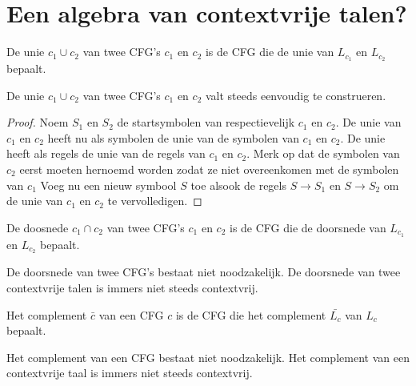 \documentclass[main.tex]{subfiles}
\begin{document}
\section{Een algebra van contextvrije talen?}

\begin{de}
  De unie $c_{1} \cup c_{2}$ van twee CFG's $c_{1}$ en $c_{2}$ is de CFG die de unie van $L_{c_{1}}$ en $L_{c_{2}}$ bepaalt.
\end{de}

\begin{st}
  De unie $c_{1} \cup c_{2}$ van twee CFG's $c_{1}$ en $c_{2}$ valt steeds eenvoudig te construeren.
  
  \begin{proof}
    Noem $S_{1}$ en $S_{2}$ de startsymbolen van respectievelijk $c_{1}$ en $c_{2}$.
    De unie van $c_{1}$ en $c_{2}$ heeft nu als symbolen de unie van de symbolen van $c_{1}$ en $c_{2}$.
    De unie heeft als regels de unie van de regels van $c_{1}$ en $c_{2}$.
    Merk op dat de symbolen van $c_{2}$ eerst moeten hernoemd worden zodat ze niet overeenkomen met de symbolen van $c_{1}$
    Voeg nu een nieuw symbool $S$ toe alsook de regels $S\rightarrow S_{1}$ en $S\rightarrow S_{2}$ om de unie van $c_{1}$ en $c_{2}$ te vervolledigen.
  \end{proof}
\end{st}

\begin{de}
  De doosnede $c_{1} \cap c_{2}$ van twee CFG's $c_{1}$ en $c_{2}$ is de CFG die de doorsnede van $L_{c_{1}}$ en $L_{c_{2}}$ bepaalt.
\end{de}

\begin{st}
  De doorsnede van twee CFG's bestaat niet noodzakelijk.
  De doorsnede van twee contextvrije talen is immers niet steeds contextvrij.
\end{st}

\begin{de}
  Het complement $\bar{c}$ van een CFG $c$ is de CFG die het complement $\bar{L_{c}}$ van $L_{c}$ bepaalt.
\end{de}

\begin{st}
  Het complement van een CFG bestaat niet noodzakelijk.
  Het complement van een contextvrije taal is immers niet steeds contextvrij.
\end{st}

\end{document}
